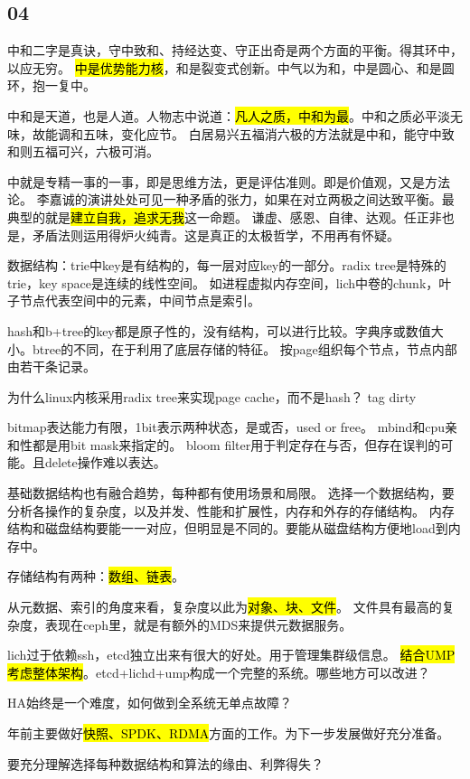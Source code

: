 \subsection{04}

中和二字是真诀，守中致和、持经达变、守正出奇是两个方面的平衡。得其环中，以应无穷。
\hl{中是优势能力核}，和是裂变式创新。中气以为和，中是圆心、和是圆环，抱一复中。

中和是天道，也是人道。人物志中说道：\hl{凡人之质，中和为最}。中和之质必平淡无味，故能调和五味，变化应节。
白居易兴五福消六极的方法就是中和，能守中致和则五福可兴，六极可消。

中就是专精一事的一事，即是思维方法，更是评估准则。即是价值观，又是方法论。
李嘉诚的演讲处处可见一种矛盾的张力，如果在对立两极之间达致平衡。最典型的就是\hl{建立自我，追求无我}这一命题。
谦虚、感恩、自律、达观。任正非也是，矛盾法则运用得炉火纯青。这是真正的太极哲学，不用再有怀疑。

数据结构：trie中key是有结构的，每一层对应key的一部分。radix tree是特殊的trie，key space是连续的线性空间。
如进程虚拟内存空间，lich中卷的chunk，叶子节点代表空间中的元素，中间节点是索引。

hash和b+tree的key都是原子性的，没有结构，可以进行比较。字典序或数值大小。btree的不同，在于利用了底层存储的特征。
按page组织每个节点，节点内部由若干条记录。

为什么linux内核采用radix tree来实现page cache，而不是hash？
tag dirty

bitmap表达能力有限，1bit表示两种状态，是或否，used or free。
mbind和cpu亲和性都是用bit mask来指定的。
bloom filter用于判定存在与否，但存在误判的可能。且delete操作难以表达。

基础数据结构也有融合趋势，每种都有使用场景和局限。
选择一个数据结构，要分析各操作的复杂度，以及并发、性能和扩展性，内存和外存的存储结构。
内存结构和磁盘结构要能一一对应，但明显是不同的。要能从磁盘结构方便地load到内存中。

存储结构有两种：\hl{数组、链表}。

从元数据、索引的角度来看，复杂度以此为\hl{对象、块、文件}。
文件具有最高的复杂度，表现在ceph里，就是有额外的MDS来提供元数据服务。

lich过于依赖ssh，etcd独立出来有很大的好处。用于管理集群级信息。
\hl{结合UMP考虑整体架构}。etcd+lichd+ump构成一个完整的系统。哪些地方可以改进？

HA始终是一个难度，如何做到全系统无单点故障？

年前主要做好\hl{快照、SPDK、RDMA}方面的工作。为下一步发展做好充分准备。

要充分理解选择每种数据结构和算法的缘由、利弊得失？
